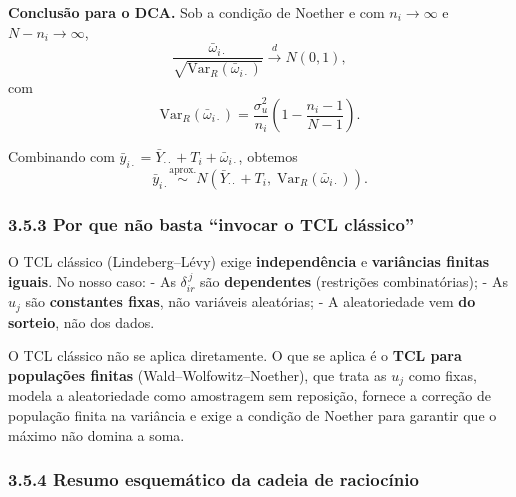 \documentclass[
]{article}
\begin{document}
\textbf{Conclusão para o DCA.} Sob a condição de Noether e com
\(n_i \to \infty\) e \(N - n_i \to \infty\),
\[\frac{\bar \omega_{i\cdot}}{\sqrt{\mathrm{Var}_R(\bar \omega_{i\cdot})}} \xrightarrow{d} N(0,1),\]
com
\[\mathrm{Var}_R(\bar \omega_{i\cdot}) = \frac{\sigma_u^2}{n_i}\left(1 - \frac{n_i - 1}{N - 1}\right).\]

Combinando com
\(\bar y_{i\cdot} = \bar Y_{\cdot\cdot} + T_i + \bar \omega_{i\cdot}\),
obtemos
\[\bar y_{i\cdot} \overset{\text{aprox.}}{\sim} N\left(\bar Y_{\cdot\cdot} + T_i, \; \mathrm{Var}_R(\bar \omega_{i\cdot})\right).\]

\subsubsection{3.5.3 Por que não basta ``invocar o TCL
clássico''}\label{por-que-nuxe3o-basta-invocar-o-tcl-cluxe1ssico}

O TCL clássico (Lindeberg--Lévy) exige \textbf{independência} e
\textbf{variâncias finitas iguais}. No nosso caso: - As
\(\delta_{ir}^{\,j}\) são \textbf{dependentes} (restrições
combinatórias); - As \(u_j\) são \textbf{constantes fixas}, não
variáveis aleatórias; - A aleatoriedade vem \textbf{do sorteio}, não dos
dados.

O TCL clássico não se aplica diretamente. O que se aplica é o
\textbf{TCL para populações finitas} (Wald--Wolfowitz--Noether), que
trata as \(u_j\) como fixas, modela a aleatoriedade como amostragem sem
reposição, fornece a correção de população finita na variância e exige a
condição de Noether para garantir que o máximo não domina a soma.

\subsubsection{3.5.4 Resumo esquemático da cadeia de
raciocínio}\label{resumo-esquemuxe1tico-da-cadeia-de-raciocuxednio}
\end{document}
